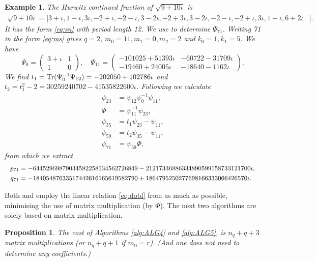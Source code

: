 \documentclass[a4paper,fleqn]{cas-sc}
\def\Tr{{\rm Tr}}
\newtheorem{proposition}[theorem]{Proposition}
\newtheorem{example}[theorem]{Example}
\begin{document}
\begin{example}
The Hurwitz continued fraction of $\sqrt{9+10\iota}$ is
\begin{align*}
\sqrt{9+10\iota}=[3 + \iota,\overline{1 - \iota, 3\iota, -2 + \iota, -2 - \iota, 3 - 2\iota, -2 + 3\iota,%
3 - 2\iota, -2 - \iota, -2 + \iota, 3\iota, 1 - \iota, 6 + 2\iota}&].
\end{align*}
It has the form \eqref{eq:sn} with period length 12. We use  to determine $\Psi_{71}$. Writing 71 in the form \eqref{eq:ms} gives $q=2$, $m_0=11,m_1=0,m_2=2$ and $k_0=1,k_1=5$. We have
\begin{equation} \label{eq:psis}
\Psi_0=\begin{pmatrix}
3+\iota  & 1 
\\
 1 & 0 
\end{pmatrix},\quad
\Psi_{11}=\begin{pmatrix}
-101025+51393 \iota  & -60722-31709 \iota  
\\
 -19460+24005 \iota  & -18640-1162 \iota  
\end{pmatrix}.
\end{equation}
We find $t_1=\Tr(\Psi_0^{-1}\Psi_{12})=-202050 + 102786\iota$ and
$t_2=t_1^2-2=30259240702 - 41535822600\iota$.
Following  we calculate
\begin{align*}
\psi_{23} &= \psi_{12}\psi_{0}^{-1} \psi_{11}, \\
\Phi &= \psi_{11}^{-1} \psi_{23}, \\
\psi_{35} &= t_{1} \psi_{23}-\psi_{11}, \\
\psi_{59} &= t_{2} \psi_{35}-\psi_{11}, \\
\psi_{71} &= \psi_{59}\Phi,
\end{align*}
from which we extract
\begin{equation} \label{eq:pq71}
{\small
\begin{split}
p_{71}&=-64452969879034582258134562726849-
21217336886334890599158733121700 \iota,\\
q_{71}&=-18405487633517442616165619582790+1864795250277698166333066426570 \iota.
\end{split}}
\end{equation}
\end{example}

Both  and  employ the linear relation \eqref{eq:dobl} from  as much as possible, minimising the use of matrix multiplication (by $\Phi$). The next two algorithms are solely based on matrix multiplication.
\begin{proposition}
The cost of Algorithms \ref{alg:ALG4} and \ref{alg:ALG5}, is $n_q+q+3$ matrix multiplications (or $n_q+q+1$ if $m_0=r$). (And one does not need to determine any coefficients.)
\end{proposition}
\end{document}
